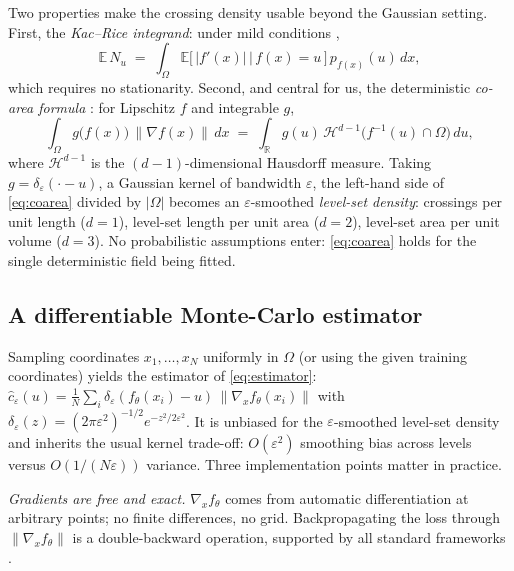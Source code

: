 \documentclass[10pt]{article}
\newcommand{\R}{\mathbb{R}}
\newcommand{\E}{\mathbb{E}}
\begin{document}
Two properties make the crossing density usable beyond the Gaussian setting. First, the
\emph{Kac--Rice integrand}: under mild conditions
\citep{azais2009level},
\begin{equation}
\E\,N_u \;=\; \int_\Omega \E\bigl[\,\lvert f'(x)\rvert \,\big|\, f(x)=u\,\bigr]\,
p_{f(x)}(u)\,dx ,
\end{equation}
which requires no stationarity. Second, and central for us, the deterministic
\emph{co-area formula} \citep{evans1992measure}: for Lipschitz $f$ and integrable $g$,
\begin{equation}
\int_\Omega g\bigl(f(x)\bigr)\,\lVert\nabla f(x)\rVert\,dx
\;=\;
\int_{\R} g(u)\,\mathcal{H}^{d-1}\bigl(f^{-1}(u)\cap\Omega\bigr)\,du,
\label{eq:coarea}
\end{equation}
where $\mathcal{H}^{d-1}$ is the $(d{-}1)$-dimensional Hausdorff measure. Taking
$g=\delta_\varepsilon(\cdot-u)$, a Gaussian kernel of bandwidth $\varepsilon$, the
left-hand side of \eqref{eq:coarea} divided by $\lvert\Omega\rvert$ becomes an
$\varepsilon$-smoothed \emph{level-set density}: crossings per unit length ($d{=}1$),
level-set length per unit area ($d{=}2$), level-set area per unit volume ($d{=}3$). No
probabilistic assumptions enter: \eqref{eq:coarea} holds for the single deterministic
field being fitted.

\subsection{A differentiable Monte-Carlo estimator}
\label{sec:estimator}

Sampling coordinates $x_1,\dots,x_N$ uniformly in $\Omega$ (or using the given training
coordinates) yields the estimator of \eqref{eq:estimator}:
$\hat c_\varepsilon(u)=\frac1N\sum_i
\delta_\varepsilon(f_\theta(x_i)-u)\,\lVert\nabla_x f_\theta(x_i)\rVert$ with
$\delta_\varepsilon(z)=(2\pi\varepsilon^2)^{-1/2}e^{-z^2/2\varepsilon^2}$.
It is unbiased for the $\varepsilon$-smoothed level-set density and inherits the usual
kernel trade-off: $O(\varepsilon^2)$ smoothing bias across levels versus
$O(1/(N\varepsilon))$ variance. Three implementation points matter in practice.

\emph{Gradients are free and exact.} $\nabla_x f_\theta$ comes from automatic
differentiation at arbitrary points; no finite differences, no grid. Backpropagating the
loss through $\lVert\nabla_x f_\theta\rVert$ is a double-backward operation, supported
by all standard frameworks \citep{paszke2019pytorch}.
\end{document}
